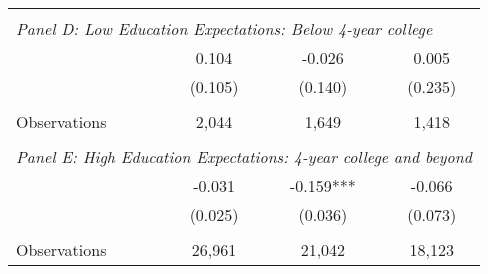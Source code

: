 {\begin{tabular}{lccc}
&  &  &   \\
\multicolumn{4}{l}{\textit{Panel D: Low Education Expectations: Below 4-year college}} \\
\hspace{3mm}        &       0.104   &      -0.026   &       0.005   \\
                    &     (0.105)   &     (0.140)   &     (0.235)   \\
                    &               &               &               \\
\hspace{3mm}Observations&       2,044   &       1,649   &       1,418   \\
 
&  &  &   \\
\multicolumn{4}{l}{\textit{Panel E: High Education Expectations: 4-year college and beyond}} \\
\hspace{3mm}        &      -0.031   &      -0.159***&      -0.066   \\
                    &     (0.025)   &     (0.036)   &     (0.073)   \\
                    &               &               &               \\
\hspace{3mm}Observations&      26,961   &      21,042   &      18,123   \\
 

\bottomrule
\end{tabular}
}
